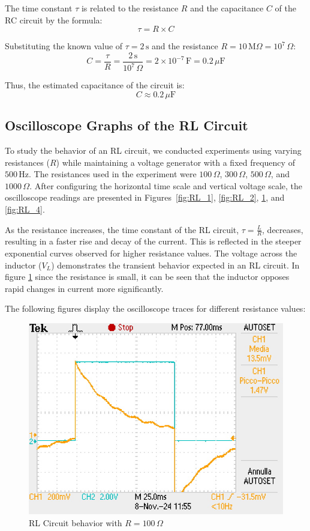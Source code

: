 \documentclass[notitlepage]{report}
\numberwithin{equation}{section}
\theoremstyle{plain}
\theoremstyle{definition}
\theoremstyle{remark}
\begin{document}
The time constant \( \tau \) is related to the resistance \( R \) and the capacitance \( C \) of the RC circuit by the formula:  
\[
\tau = R \times C
\]

Substituting the known value of \( \tau = 2 \, \text{s} \) and the resistance \( R = 10 \, \text{M}\Omega = 10^7 \, \Omega \):  
\[
C = \frac{\tau}{R} = \frac{2 \, \text{s}}{10^7 \, \Omega} = 2 \times 10^{-7} \, \text{F} = 0.2 \, \mu\text{F}
\]

Thus, the estimated capacitance of the circuit is:  
\[
C \approx 0.2 \, \mu\text{F}
\]

    \subsection{Oscilloscope Graphs of the RL Circuit}
To study the behavior of an RL circuit, we conducted experiments using varying resistances (\(R\)) while maintaining a voltage generator with a fixed frequency of \(500 \, \text{Hz}\). The resistances used in the experiment were \(100 \, \Omega\), \(300 \, \Omega\), \(500 \, \Omega\), and \(1000 \, \Omega\). After configuring the horizontal time scale and vertical voltage scale, the oscilloscope readings are presented in Figures~\ref{fig:RL_1}, \ref{fig:RL_2}, \ref{fig:RL_3}, and \ref{fig:RL_4}.

As the resistance increases, the time constant of the RL circuit, \(\tau = \frac{L}{R}\), decreases, resulting in a faster rise and decay of the current. This is reflected in the steeper exponential curves observed for higher resistance values. The voltage across the inductor (\(V_L\)) demonstrates the transient behavior expected in an RL circuit. In figure \ref{fig:RL_3} since the resistance is small, it can be seen that the inductor opposes rapid changes in current more significantly.

The following figures display the oscilloscope traces for different resistance values:

\begin{figure}[h!]
    \centering
    \includegraphics[width=0.4\linewidth]{figures/RL_graph_4.JPG}
    \caption{RL Circuit behavior with \(R = 100 \, \Omega\)}
    \label{fig:RL_3}
\end{figure}
\end{document}
